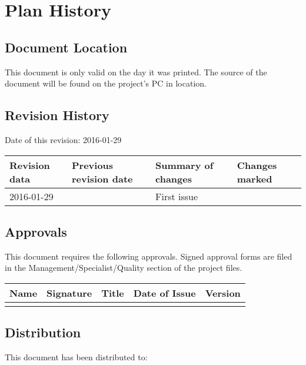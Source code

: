 \documentclass{report}
\begin{document}
\princeplan
{}
\date{\today}
\author{P.Ryzhov}
\maketitle

\chapter{Plan History}

\section{Document Location}
This document is only valid on the day it was printed.
The source of the document will be found on the project's PC in location.

\section{Revision History}

Date of this revision: 2016-01-29

\begin{center}
    \begin{tabular}{| p{2cm} | p{2cm} | l | p{2cm} |}
    \hline
    Revision data & Previous revision date & Summary of changes & Changes marked \\
    \hline
    2016-01-29 & & First issue & \\
    \hline
    \end{tabular}
\end{center}

\section{Approvals}
This document requires the following approvals.
Signed approval forms are filed in the Management/Specialist/Quality section of the project files.

\begin{center}
    \begin{tabular}{| p{2cm} | p{2cm} | l | p{2cm} | p{2cm} |}
    \hline
    Name & Signature & Title & Date of Issue & Version \\
    \hline
     & & & & \\
    \hline
    \end{tabular}
\end{center}

\section{Distribution}
This document has been distributed to:
\end{document}
